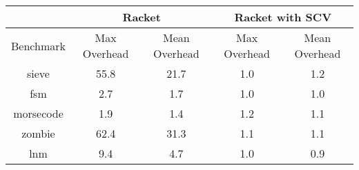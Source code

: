 \begin{tabular}{ | c | c c | c c | }
\hline
& \multicolumn{2}{|c|}{Racket}
& \multicolumn{2}{|c|}{Racket with SCV} \\
\hline
Benchmark
& Max Overhead & Mean Overhead
& Max Overhead & Mean Overhead \\
\hline
sieve & 55.8 & 21.7 & 1.0 & 1.2\\fsm & 2.7 & 1.7 & 1.0 & 1.0\\morsecode & 1.9 & 1.4 & 1.2 & 1.1\\zombie & 62.4 & 31.3 & 1.1 & 1.1\\lnm & 9.4 & 4.7 & 1.0 & 0.9 \\
\hline
\end{tabular}
